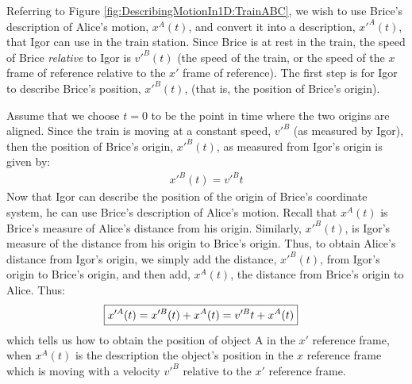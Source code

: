 Referring to Figure \ref{fig:DescribingMotionIn1D:TrainABC}, we wish to use Brice's description of Alice's motion, $x^A(t)$, and convert it into a description, $x'^A(t)$, that Igor can use in the train station. Since Brice is at rest in the train, the speed of Brice \textit{relative} to Igor is $v'^B(t)$ (the speed of the train, or the speed of the $x$ frame of reference relative to the $x'$ frame of reference). The first step is for Igor to describe Brice's position, $x'^B(t)$, (that is, the position of Brice's origin).

Assume that we choose $t=0$ to be the point in time where the two origins are aligned. Since the train is moving at a constant speed, $v'^B$ (as measured by Igor), then the position of Brice's origin, $x'^B(t)$, as measured from Igor's origin is given by:
\begin{align*}
x'^B(t)=v'^Bt
\end{align*}
Now that Igor can describe the position of the origin of Brice's coordinate system, he can use Brice's description of Alice's motion. Recall that $x^A(t)$ is Brice's measure of Alice's distance from his origin. Similarly, $x'^B(t)$, is Igor's measure of the distance from his origin to Brice's origin. Thus, to obtain Alice's distance from Igor's origin, we simply add the distance, $x'^B(t)$, from Igor's origin to Brice's origin, and then add, $x^A(t)$, the distance from Brice's origin to Alice. Thus:
\begin{align}
\Aboxed{x'^A(t)=x'^B(t)+x^A(t)=v'^Bt+x^A(t)}
\end{align}
which tells us how to obtain the position of object A in the $x'$ reference frame, when $x^A(t)$ is the description the object's position in the $x$ reference frame which is moving with a velocity $v'^B$ relative to the $x'$ reference frame.

